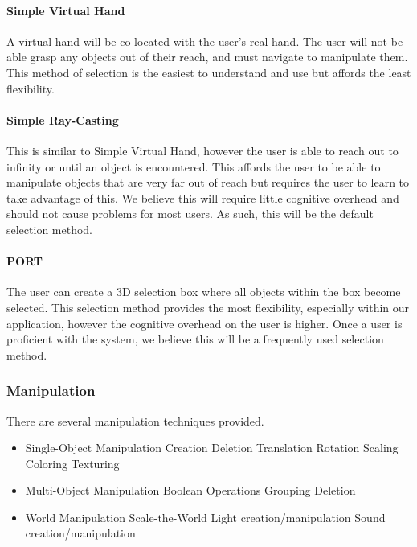 \paragraph{Simple Virtual Hand}
A virtual hand will be co-located with the user's real hand.
The user will not be able grasp any objects out of their reach, and must navigate to manipulate them.
This method of selection is the easiest to understand and use but affords the least flexibility.

\paragraph{Simple Ray-Casting}
This is similar to Simple Virtual Hand, however the user is able to reach out to infinity or until an object is encountered.
This affords the user to be able to manipulate objects that are very far out of reach but requires the user to learn to take advantage of this.
We believe this will require little cognitive overhead and should not cause problems for most users.
As such, this will be the default selection method.

\paragraph{PORT}
The user can create a 3D selection box where all objects within the box become selected.
This selection method provides the most flexibility, especially within our application, however the cognitive overhead on the user is  higher.
Once a user is proficient with the system, we believe this will be a frequently used selection method.

\subsubsection{Manipulation}
\label{Design:Interaction:Manipulation}
There are several manipulation techniques provided.
\begin{itemize}
	\item Single-Object Manipulation
		\subitem Creation
		\subitem Deletion
		\subitem Translation
		\subitem Rotation
		\subitem Scaling
		\subitem Coloring
		\subitem Texturing
	\item Multi-Object Manipulation
		\subitem Boolean Operations
		\subitem Grouping
		\subitem Deletion
	\item World Manipulation
		\subitem Scale-the-World
		\subitem Light creation/manipulation
		\subitem Sound creation/manipulation
\end{itemize}

